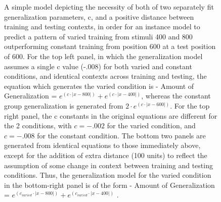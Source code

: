 \documentclass[
  letterpaper,
  DIV=11,
  numbers=noendperiod]{scrartcl}
\begin{document}
\begin{figure}[H]


\caption{\label{fig-Toy-Model2}A simple model depicting the necessity of
both of two separately fit generalization parameters, c, and a positive
distance between training and testing contexts, in order for an instance
model to predict a pattern of varied training from stimuli 400 and 800
outperforming constant training from position 600 at a test position of
600. For the top left panel, in which the generalization model assumes a
single c value (-.008) for both varied and constant conditions, and
identical contexts across training and testing, the equation which
generates the varied condition is - Amount of Generalization =
\(e^{(c\cdot|x-800|)} + e^{(c\cdot|x-400|)}\), whereas the constant
group generalization is generated from \(2\cdot e^{(c\cdot|x-600|)}\).
For the top right panel, the c constants in the original equations are
different for the 2 conditions, with \(c=-.002\) for the varied
condition, and \(c=-.008\) for the constant condition. The bottom two
panels are generated from identical equations to those immediately
above, except for the addition of extra distance (100 units) to reflect
the assumption of some change in context between training and testing
conditions. Thus, the generalization model for the varied condition in
the bottom-right panel is of the form - Amount of Generalization =
\(e^{(c_{varied}\cdot|x-800|)}+e^{(c_{varied}\cdot|x-400|)}\) .}

\end{figure}%
\end{document}
